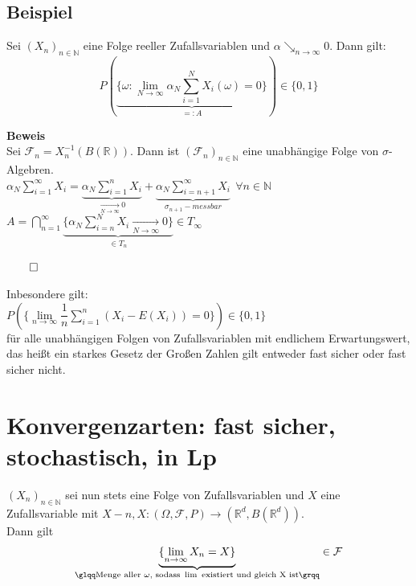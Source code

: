 \documentclass[german,10pt,oneside, fleqn, a4paper]{article}
\newcommand {\R}	{\mathbb{R}}
\newcommand {\N}	{\mathbb{N}}
\newcommand{\brc}[1]{\left(#1\right)}
\newcommand{\QED}{\begin{flushright}$\qed$\end{flushright}}
\newcommand{\mc}[1]{\mathcal{#1}}
\newcommand{\1}[1]{1_{#1}}
\newcommand{\2}[1]{\1{\brac{#1}}}
\newcommand{\raum}{\brc{\Omega,\mc{F},P}}
\newcommand{\f}{\mc{F}}
\begin{document}
\subsection{Beispiel}
Sei $\left(X_n\right)_{n\in\N}$ eine Folge reeller Zufallsvariablen und $\alpha \searrow_{n\rightarrow\infty}0$. Dann gilt:
\[ P\left(\underbrace{\lbrace\omega:\lim\limits_{N\rightarrow\infty} \alpha_N\sum\limits_{i=1}^NX_i\left(\omega\right)=0\rbrace}_{=:A}\right)\in\lbrace 0,1 \rbrace\]

\textbf{Beweis}\\
Sei $\f_n=X_n^{-1}(B(\R))$. Dann ist $(\f_n)_{n\in\N}$ eine unabhängige Folge von $\sigma$-Algebren.\\
$\alpha_N\sum\limits_{i=1}^\infty X_i=\underbrace{{\alpha_N}\sum\limits_{i=1}^n X_i}_{\xrightarrow[N\rightarrow\infty]{}0}+\underbrace{{\alpha_N}\sum\limits_{i=n+1}^\infty X_i}_{\sigma_{n+1}-messbar}\ \ \forall n\in\N$\\
$A=\bigcap\limits_{n=1}^\infty\underbrace{\lbrace\alpha_N\sum\limits_{i=n}^NX_i\xrightarrow[N\rightarrow\infty]{}0\rbrace}_{\in T_n}\in T_\infty$\QED
Inbesondere gilt:\\
$P(\lbrace\lim\limits_{n\rightarrow\infty}\dfrac{1}{n}\sum\limits_{i=1}^n(X_i-E(X_i))=0\rbrace)\in\lbrace 0,1\rbrace$\\
für alle unabhängigen Folgen von Zufallsvariablen mit endlichem Erwartungswert, das heißt ein starkes Gesetz der Großen Zahlen gilt entweder fast sicher oder \glqq fast sicher nicht\grqq . 





\pagebreak

\section{Konvergenzarten: fast sicher, stochastisch, in Lp}
$\left(X_n\right)_{n\in\N}$ sei nun stets eine Folge von Zufallsvariablen und $X$ eine Zufallsvariable mit $X-n, X:\raum\rightarrow\left(\R^d,B\left(\R^d\right)\right)$.\\
Dann gilt \[\underbrace{\lbrace\lim\limits_{n\rightarrow\infty}X_n=X\rbrace}_{\glqq \text{Menge aller }\omega\text{, sodass }\lim\text{ existiert und gleich X ist}\grqq}\in\f\]
\end{document}
